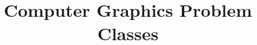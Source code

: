 \documentclass[a4paper, answers]{exam}
\title{Computer Graphics Problem Classes}
\author{}
\begin{document}
    \maketitle
    \begin{questions}
        
    \end{questions}
\end{document}
